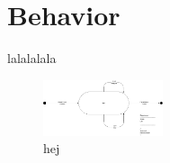 \section{Behavior}
lalalalala

\begin{figure}
\includegraphics[width=100pt]{input/problem_domain_analysis/Klasse_diagram_department.jpg}
\caption{hej}
\label{}
\end{figure}
